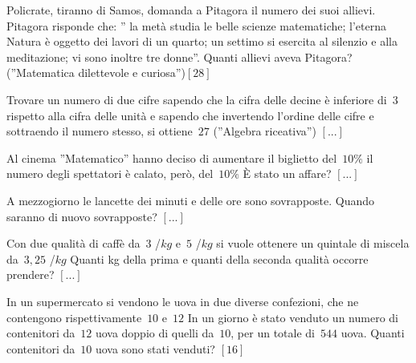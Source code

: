 \begin{multicols}{2}
\begin{esercizio}[\Ast]
\label{ese:14.44}
Policrate, tiranno di Samos, domanda a Pitagora il numero dei suoi allievi. 
Pitagora risponde che: '' la metà studia le belle scienze matematiche; l'eterna 
Natura è oggetto dei lavori di un quarto; un settimo si esercita al silenzio e 
alla meditazione; vi sono inoltre tre donne''. Quanti allievi aveva Pitagora? 
(''Matematica dilettevole e curiosa'')\hfill \(\left[28\right]\)
\end{esercizio}

\begin{esercizio}
\label{ese:14.45}
Trovare un numero di due cifre sapendo che la cifra delle decine è inferiore 
di~\(3\) rispetto alla cifra delle unità e sapendo che invertendo l'ordine delle 
cifre e sottraendo il numero stesso, si ottiene~\(27\) (''Algebra riceativa'')
 \hfill \(\left[...\right]\)
\end{esercizio}

\begin{esercizio}
\label{ese:14.46}
Al cinema ''Matematico'' hanno deciso di aumentare il biglietto del~\(10 \%\) il 
numero degli spettatori è calato, però, del~\(10 \%\) È stato un affare?
 \hfill \(\left[...\right]\)
\end{esercizio}

\begin{esercizio}
\label{ese:14.47}
A mezzogiorno le lancette dei minuti e delle ore sono sovrapposte. Quando 
saranno di nuovo sovrapposte? \hfill \(\left[...\right]\)
\end{esercizio}

\begin{esercizio}
\label{ese:14.48}
Con due qualità di caffè da~\(3\) \officialeuro/\(\unit{kg}\) e~\(5\) 
\officialeuro/\(\unit{kg}\) si vuole ottenere un quintale di miscela da~\(3,25\) 
\officialeuro/\(\unit{kg}\) Quanti kg della prima e quanti della seconda qualità 
occorre prendere? \hfill \(\left[...\right]\)
\end{esercizio}

\begin{esercizio}[\Ast]
\label{ese:14.49}
In un supermercato si vendono le uova in due diverse confezioni, che ne 
contengono rispettivamente~\(10\) e~\(12\) In un giorno è stato venduto un numero di 
contenitori da~\(12\) uova doppio di quelli da~\(10\), per un totale di~\(544\) uova. 
Quanti contenitori da~\(10\) uova sono stati venduti? \hfill \(\left[16\right]\)
\end{esercizio}


\end{multicols}
